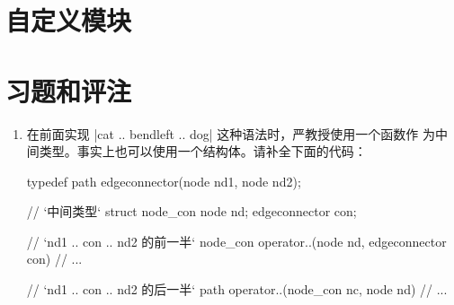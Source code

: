 \section{自定义模块}

\section{习题和评注}

\begin{enumerate}
  \item 在前面实现 |cat .. bendleft .. dog| 这种语法时，严教授使用一个函数作
    为中间类型。事实上也可以使用一个结构体。请补全下面的代码：
\begin{asycode}
typedef path edgeconnector(node nd1, node nd2);

// `\color{comment}中间类型`
struct node_con {
    node nd;
    edgeconnector con;
}

// `\color{comment}nd1 .. con .. nd2 的前一半`
node_con operator..(node nd, edgeconnector con)
{
    // ...
}

// `\color{comment}nd1 .. con .. nd2 的后一半`
path operator..(node_con nc, node nd)
{
    // ...
}
\end{asycode}
\end{enumerate}
\endinput



